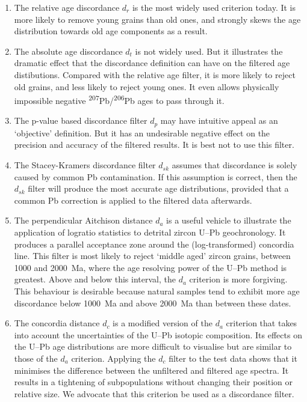 \documentclass[gchron, manuscript]{copernicus}
\begin{document}
\begin{enumerate}
  \item The relative age discordance $d_r$ is the most widely used
    criterion today. It is more likely to remove young grains than old
    ones, and strongly skews the age distribution towards old age
    components as a result.
  \item The absolute age discordance $d_t$ is not widely used. But it
    illustrates the dramatic effect that the discordance definition
    can have on the filtered age distibutions. Compared with the
    relative age filter, it is more likely to reject old grains, and
    less likely to reject young ones. It even allows physically
    impossible negative
    \textsuperscript{207}Pb/\textsuperscript{206}Pb ages to pass
    through it.
  \item The p-value based discordance filter $d_p$ may have intuitive
    appeal as an `objective' definition. But it has an undesirable
    negative effect on the precision and accuracy of the filtered
    results. It is best not to use this filter.
  \item The Stacey-Kramers discordance filter $d_{sk}$ assumes that
    discordance is solely caused by common Pb contamination. If this
    assumption is correct, then the $d_{sk}$ filter will produce the
    most accurate age distributions, provided that a
    \citet{stacey1975} common Pb correction is applied to the filtered
    data afterwards.
  \item The perpendicular Aitchison distance $d_a$ is a useful vehicle
    to illustrate the application of logratio statistics to detrital
    zircon U--Pb geochronology. It produces a parallel acceptance zone
    around the (log-transformed) concordia line. This filter is most
    likely to reject `middle aged' zircon grains, between 1000 and
    2000~Ma, where the age resolving power of the U--Pb method is
    greatest. Above and below this interval, the $d_a$ criterion is
    more forgiving. This behaviour is desirable because natural
    samples tend to exhibit more age discordance below 1000~Ma and
    above 2000~Ma than between these dates.
  \item The concordia distance $d_c$ is a modified version of the
    $d_a$ criterion that takes into account the uncertainties of the
    U--Pb isotopic composition.  Its effects on the U--Pb age
    distributions are more difficult to visualise but are similar to
    those of the $d_a$ criterion.  Applying the $d_c$ filter to the
    test data shows that it minimises the difference between the
    unfiltered and filtered age spectra. It results in a tightening of
    subpopulations without changing their position or relative
    size. We advocate that this criterion be used as a discordance
    filter.
\end{enumerate}
\end{document}
